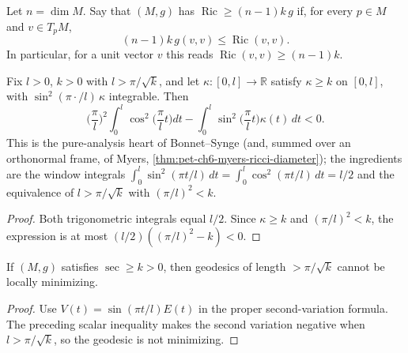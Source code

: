 \begin{definition}
  \label{def:pet-ch6-ricci-lower-bound}


  Let $n=\dim M$.  Say that $(M,g)$ has
  $\operatorname{Ric}\ge(n-1)k\,g$ if, for every $p\in M$ and $v\in T_pM$,
  \[
    (n-1)k\,g(v,v)\le \operatorname{Ric}(v,v).
  \]
  In particular, for a unit vector $v$ this reads
  $\operatorname{Ric}(v,v)\ge(n-1)k$.
\end{definition}

\begin{lemma}
  \label{lem:pet-ch6-bonnet-synge-index-core}


  Fix $l>0$, $k>0$ with $l>\pi/\sqrt k$, and let $\kappa:[0,l]\to\mathbb R$ satisfy
  $\kappa\ge k$ on $[0,l]$, with $\sin^2(\pi\cdot/l)\,\kappa$ integrable. Then
  \[
    \Big(\frac\pi l\Big)^2\int_0^l\cos^2\Big(\frac\pi lt\Big)dt
      -\int_0^l\sin^2\Big(\frac\pi lt\Big)\kappa(t)\,dt<0 .
  \]
  This is the pure-analysis heart of Bonnet--Synge (and, summed over an orthonormal frame,
  of Myers, \cref{thm:pet-ch6-myers-ricci-diameter}); the ingredients are the window
  integrals $\int_0^l\sin^2(\pi t/l)\,dt=\int_0^l\cos^2(\pi t/l)\,dt=l/2$ and the equivalence
  of $l>\pi/\sqrt k$ with $(\pi/l)^2<k$.
\end{lemma}
\begin{proof}

  \sketch
  Both trigonometric integrals equal \(l/2\). Since \(\kappa\ge k\) and \((\pi/l)^2<k\), the expression is at most \((l/2)((\pi/l)^2-k)<0\).
\end{proof}

\begin{lemma}
  \label{lem:pet-ch6-bonnet-synge-diameter}


  If $(M,g)$ satisfies $\sec\ge k>0$, then geodesics of length $>\pi/\sqrt k$
  cannot be locally minimizing.
\end{lemma}
\begin{proof}
  \sketch
  Use \(V(t)=\sin(\pi t/l)E(t)\) in the proper second-variation formula. The preceding scalar inequality makes the second variation negative when \(l>\pi/\sqrt{k}\), so the geodesic is not minimizing.
\end{proof}


